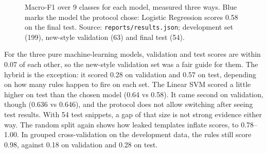 \documentclass[11pt,a4paper]{article}
\newcommand{\code}[1]{\texttt{#1}}
\begin{document}
\begin{figure}[H]
\centering
{}
\caption{Macro-F1 over 9 classes for each model, measured three ways. Blue marks the model
the protocol chose: Logistic Regression scores 0.58 on the final test. Source:
\code{reports/results.json}; development set (199), new-style validation (63) and final
test (54).}
\label{fig:results}
\end{figure}

For the three pure machine-learning models, validation and test scores are within 0.07 of
each other, so the new-style validation set was a fair guide for them. The hybrid is the
exception: it scored 0.28 on validation and 0.57 on test, depending on how many rules
happen to fire on each set. The Linear SVM scored a little higher on test than the chosen
model (0.64 vs 0.58). It came second on validation, though (0.636 vs 0.646), and the
protocol does not allow switching after seeing test results. With 54 test snippets, a gap
of that size is not strong evidence either way. The random split again shows how leaked
templates inflate scores, to 0.78--1.00. In grouped cross-validation on the development
data, the rules still score 0.98, against 0.18 on validation and 0.28 on test.
\end{document}
